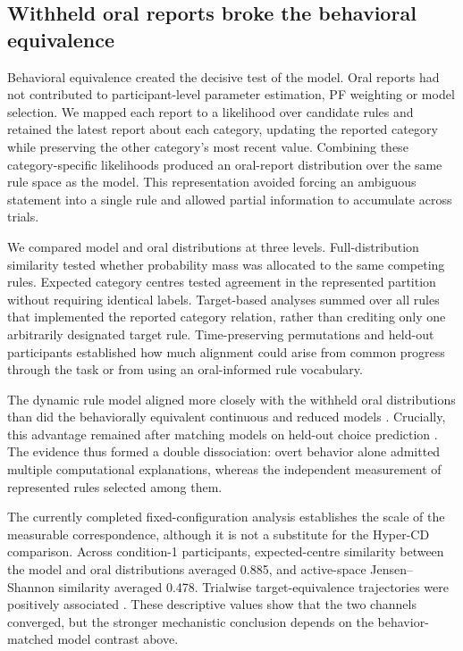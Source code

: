 
\subsection{Withheld oral reports broke the behavioral equivalence}

Behavioral equivalence created the decisive test of the model. Oral reports had
not contributed to participant-level parameter estimation, PF weighting or
model selection. We mapped each report to a likelihood over candidate rules and
retained the latest report about each category, updating the reported category
while preserving the other category's most recent value. Combining these
category-specific likelihoods produced an oral-report distribution over the
same rule space as the model. This representation avoided forcing an ambiguous
statement into a single rule and allowed partial information to accumulate
across trials.

We compared model and oral distributions at three levels. Full-distribution
similarity tested whether probability mass was allocated to the same competing
rules. Expected category centres tested agreement in the represented partition
without requiring identical labels. Target-based analyses summed over all rules
that implemented the reported category relation, rather than crediting only one
arbitrarily designated target rule. Time-preserving permutations and held-out
participants established how much alignment could arise from common progress
through the task or from using an oral-informed rule vocabulary.

The dynamic rule model aligned more closely with the withheld oral distributions
than did the behaviorally equivalent continuous and reduced models
. Crucially, this advantage remained after matching
models on held-out choice prediction . The evidence thus formed a double dissociation: overt
behavior alone admitted multiple computational explanations, whereas the
independent measurement of represented rules selected among them.

The currently completed fixed-configuration analysis establishes the scale of
the measurable correspondence, although it is not a substitute for the
Hyper-CD comparison. Across condition-1 participants, expected-centre similarity
between the model and oral distributions averaged 0.885, and active-space
Jensen--Shannon similarity averaged 0.478. Trialwise target-equivalence
trajectories were positively associated . These descriptive values show that the two
channels converged, but the stronger mechanistic conclusion depends on the
behavior-matched model contrast above.

